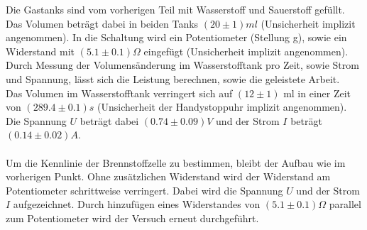 \documentclass[12pt,a4paper,twoside]{article}
\begin{document}
\noindent
Die Gastanks sind vom vorherigen Teil mit Wasserstoff und Sauerstoff gefüllt. Das Volumen beträgt dabei in beiden Tanks $(20 \pm 1) ml$ (Unsicherheit implizit angenommen).  
In die Schaltung wird ein Potentiometer (Stellung g), sowie ein Widerstand mit $(5.1 \pm 0.1) \Omega$ eingefügt (Unsicherheit implizit angenommen). 
Durch Messung der Volumensänderung im Wasserstofftank pro Zeit, sowie Strom und Spannung, lässt sich die Leistung berechnen, sowie die geleistete Arbeit. 
\\
Das Volumen im Wasserstofftank verringert sich auf $(12 \pm 1)$ ml in einer Zeit von $(289.4 \pm 0.1) s $ (Unsicherheit der Handystoppuhr implizit angenommen). 
Die Spannung $U$ beträgt dabei $(0.74 \pm 0.09)V$ und der Strom $I$ beträgt $(0.14 \pm 0.02)A$. 
\\
\\
Um die Kennlinie der Brennstoffzelle zu bestimmen, bleibt der Aufbau wie im vorherigen Punkt. 
Ohne zusätzlichen Widerstand wird der Widerstand am Potentiometer schrittweise verringert. Dabei wird die Spannung $U$ und der Strom $I$ aufgezeichnet. 
Durch hinzufügen eines Widerstandes von $(5.1 \pm 0.1) \Omega$ parallel zum Potentiometer wird der Versuch erneut durchgeführt. 
\end{document}
